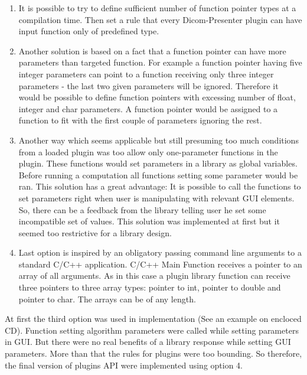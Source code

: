 \begin{enumerate}
\item It is possible to try to define sufficient number of function pointer types at a compilation time. Then set a rule that every Dicom-Presenter plugin can have input function only of predefined type.
\item Another solution is based on a fact that a function pointer can have more parameters than targeted function. For example a function pointer having five integer parameters can point to a function receiving only three integer parameters - the last two given parameters will be ignored. Therefore it would be possible to define function pointers with excessing number of float, integer and char parameters. A function pointer would be assigned to a function to fit with the first couple of parameters ignoring the rest.
\item Another way which seems applicable but still presuming too much conditions from a loaded plugin was too allow only one-parameter functions in the plugin. These functions would set parameters in a library as global variables. Before running a computation all functions setting some parameter would be ran. This solution has a great advantage: It is possible to call the functions to set parameters right when user is manipulating with relevant GUI elements. So, there can be a feedback from the library telling user he set some incompatible set of values. This solution was implemented at first but it seemed too restrictive for a library design. 
\item Last option is inspired by an obligatory passing command line arguments to a standard C/C++ application. C/C++ Main Function receives a pointer to an array of all arguments. As in this case a plugin library function can receive three pointers to three array types: pointer to int, pointer to double and pointer to char. The arrays can be of any length.
\end{enumerate}

At first the third option was used in implementation (See an example on encloced CD). Function setting algorithm parameters were called while setting parameters in GUI. But there were no real benefits of a library response while setting GUI parameters. More than that the rules for plugins were too bounding. So therefore, the final version of plugins API were implemented using option 4.
